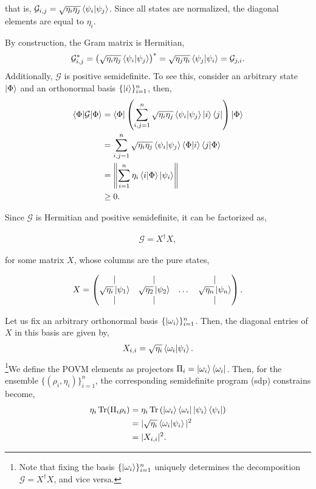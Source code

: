 \documentclass[12pt,letterpaper]{article}
\DeclareMathOperator{\tr}{Tr}
\begin{document}
that is, $\mathcal{G}_{i,j} = \sqrt{\eta_i\eta_j}\braket{\psi_i|\psi_j}$. Since all states are normalized, the diagonal elements are equal to $\eta_i$.

By construction, the Gram matrix is Hermitian,
\begin{align*}
	\mathcal{G}_{i,j}^* = \left( \sqrt{\eta_i\eta_j}\braket{\psi_i|\psi_j}\right)^* =  \sqrt{\eta_j\eta_i}\braket{\psi_j|\psi_i} = \mathcal{G}_{j,i}.
\end{align*}
Additionally, $\mathcal{G}$ is positive semidefinite. To see this, consider an arbitrary state $\ket{\Phi}$ and an orthonormal basis $\{\ket{i}\}_{i=1}^n$, then,
\begin{align*}
	\braket{\Phi|\mathcal{G}|\Phi} &= \braket{\Phi| \left( \sum_{i,j=1}^{n} \sqrt{\eta_i\eta_j}\braket{\psi_i|\psi_j} \ket{i}\bra{j} \right) |\Phi} \\
	&= \sum_{i,j=1}^{n} \sqrt{\eta_i\eta_j}\braket{\psi_i|\psi_j} \braket{\Phi|i} \braket{j|\Phi} \\
	&= \left\| \sum_{i=1}^{n} \eta_i\braket{i|\Phi} \ket{\psi_i} \right\|\\
	&\geq 0.
\end{align*}

Since $\mathcal{G}$ is Hermitian and positive semidefinite, it can be factorized as,

\begin{align*}
	\mathcal{G} = X^\dagger X,
\end{align*}

for some matrix $X$, whose columns are the pure states,

\begin{align*}
	X = \begin{pmatrix}
		\mid & \mid &        & \mid \\
		\sqrt{\eta_i}\ket{\psi_1} & \sqrt{\eta_2}\ket{\psi_2} & \dots & \sqrt{\eta_n}\ket{\psi_n} \\
		\mid & \mid &        & \mid
	\end{pmatrix}.
\end{align*}

Let us fix an arbitrary orthonormal basis $\{\ket{\omega_i}\}_{i=1}^n$. Then, the diagonal entries of $X$ in this basis are given by,
\begin{align*}
	X_{i,i} = \sqrt{\eta_i}\braket{\omega_i|\psi_i}.
\end{align*}
\footnote{Note that fixing the basis $\{\ket{\omega_i}\}_{i=1}^n$ uniquely determines the decomposition $\mathcal{G} = X^\dagger X$, and vice versa.}We define the POVM elements as projectors $\Pi_i = \ket{\omega_i}\bra{\omega_i}$. Then, for the ensemble $\{(\rho_i, \eta_i)\}_{i=1}^n$, the corresponding semidefinite program (\gls{sdp}) constrains become,
\begin{align*}
	\eta_i\tr(\Pi_i \rho_i) &= \eta_i\tr\left( \ket{\omega_i}\bra{\omega_i} \ket{\psi_i}\bra{\psi_i} \right) \\
	&= |\sqrt{\eta_i}\braket{\omega_i|\psi_i}|^2 \\
	&= |X_{i,i}|^2.
\end{align*}
\end{document}
